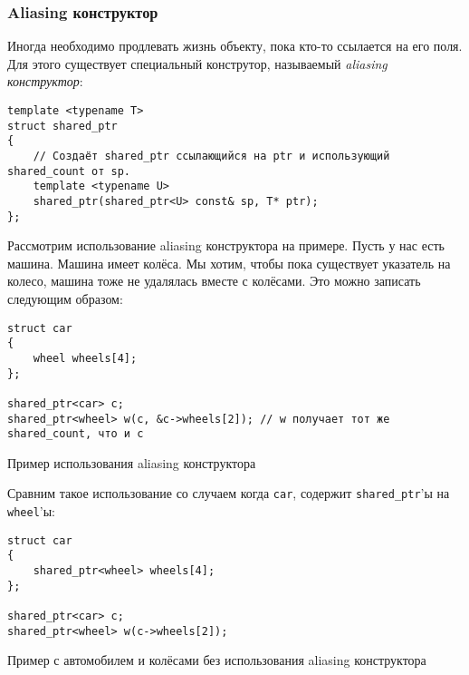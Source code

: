 \subsubsection{Aliasing конструктор}

Иногда необходимо продлевать жизнь объекту, пока кто-то ссылается на его поля. Для этого существует специальный конструтор, называемый {\it aliasing конструктор}:

\begin{verbatim}
template <typename T>
struct shared_ptr
{
    // Создаёт shared_ptr ссылающийся на ptr и использующий shared_count от sp.
    template <typename U>
    shared_ptr(shared_ptr<U> const& sp, T* ptr); 
};
\end{verbatim}

Рассмотрим использование aliasing конструктора на примере. Пусть у нас есть машина. Машина имеет колёса. Мы хотим, чтобы пока существует указатель на колесо, машина тоже не удалялась вместе с колёсами. Это можно записать следующим образом:

\begin{listing}
\begin{verbatim}
struct car
{
    wheel wheels[4];
};

shared_ptr<car> c;
shared_ptr<wheel> w(c, &c->wheels[2]); // w получает тот же shared_count, что и c
\end{verbatim}
\caption{Пример использования aliasing конструктора}
\label{listing:shared_ptr_aliasing_ctor_example}
\end{listing}

Сравним такое использование со случаем когда \texttt{car}, содержит \texttt{shared_ptr}'ы на \texttt{wheel}'ы:

\begin{listing}
\begin{verbatim}
struct car
{
    shared_ptr<wheel> wheels[4];
};

shared_ptr<car> c;
shared_ptr<wheel> w(c->wheels[2]);
\end{verbatim}
\caption{Пример с автомобилем и колёсами без использования aliasing конструктора}
\label{listing:shared_ptr_car_wheels_example}
\end{listing}

